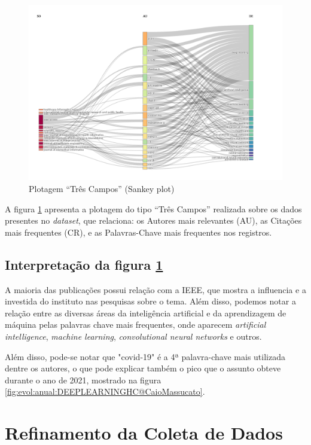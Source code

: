 \begin{figure}
    \centering
    \includegraphics[width=1\textwidth]{experiments/CaioMassucato/PesquisaBibliometrica/DeepLearningHC/threeFields.png}
    \caption{Plotagem ``Três Campos'' (Sankey plot)}
    \label{fig:threeFields:DEEPLEARNINGHC@CaioMassucato}
\end{figure}

A figura \ref{fig:threeFields:DEEPLEARNINGHC@CaioMassucato} apresenta a plotagem do tipo ``Três Campos'' realizada sobre os dados presentes no \textit{dataset}, que relaciona:  os Autores mais relevantes (AU), as Citações mais frequentes (CR), e as Palavras-Chave mais frequentes nos registros.

\subsection{Interpretação da figura \ref{fig:threeFields:DEEPLEARNINGHC@CaioMassucato}}
A maioria das publicações possui relação com a IEEE, que mostra a influencia e a investida do instituto nas pesquisas sobre o tema. Além disso, podemos notar a relação entre as diversas áreas da inteligência artificial e da aprendizagem de máquina pelas palavras chave mais frequentes, onde aparecem \textit{artificial intelligence}, \textit{machine learning}, \textit{convolutional neural networks} e outros.

Além disso, pode-se notar que "covid-19" é a 4ª palavra-chave mais utilizada dentre os autores, o que pode explicar também o pico que o assunto obteve durante o ano de 2021, mostrado na figura \ref{fig:evol:anual:DEEPLEARNINGHC@CaioMassucato}.

\section{Refinamento da Coleta de Dados}


